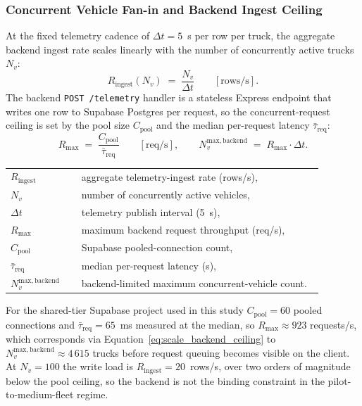 \subsubsection{Concurrent Vehicle Fan-in and Backend Ingest Ceiling}
\label{sec:scale_backend_fanin}

At the fixed telemetry cadence of $\Delta t = 5$~s per row per truck, the aggregate backend ingest rate scales linearly with the number of concurrently active trucks $N_v$:
\begin{equation}
R_{\mathrm{ingest}}(N_v) \;=\; \frac{N_v}{\Delta t} \qquad [\text{rows/s}].
\label{eq:scale_ingest_rate}
\end{equation}
The backend \texttt{POST /telemetry} handler is a stateless Express endpoint that writes one row to Supabase Postgres per request, so the concurrent-request ceiling is set by the pool size $C_{\mathrm{pool}}$ and the median per-request latency $\bar{\tau}_{\mathrm{req}}$:
\begin{equation}
R_{\mathrm{max}} \;=\; \frac{C_{\mathrm{pool}}}{\bar{\tau}_{\mathrm{req}}} \qquad [\text{req/s}],
\qquad
N_v^{\mathrm{max,backend}} \;=\; R_{\mathrm{max}} \cdot \Delta t.
\label{eq:scale_backend_ceiling}
\end{equation}
\noindent\begin{tabular}{@{}p{0.20\linewidth}@{\quad}p{0.68\linewidth}@{}}
$R_{\mathrm{ingest}}$ & aggregate telemetry-ingest rate (rows/s), \\
$N_v$ & number of concurrently active vehicles, \\
$\Delta t$ & telemetry publish interval (5~s), \\
$R_{\mathrm{max}}$ & maximum backend request throughput (req/s), \\
$C_{\mathrm{pool}}$ & Supabase pooled-connection count, \\
$\bar{\tau}_{\mathrm{req}}$ & median per-request latency (s), \\
$N_v^{\mathrm{max,backend}}$ & backend-limited maximum concurrent-vehicle count.
\end{tabular}

\vspace{0.5em}
For the shared-tier Supabase project used in this study $C_{\mathrm{pool}} = 60$ pooled connections and $\bar{\tau}_{\mathrm{req}} = 65$~ms measured at the median, so $R_{\mathrm{max}} \approx 923$ requests/s, which corresponds via Equation~\ref{eq:scale_backend_ceiling} to $N_v^{\mathrm{max,backend}} \approx 4\,615$ trucks before request queuing becomes visible on the client. At $N_v = 100$ the write load is $R_{\mathrm{ingest}} = 20$~rows/s, over two orders of magnitude below the pool ceiling, so the backend is not the binding constraint in the pilot-to-medium-fleet regime.

